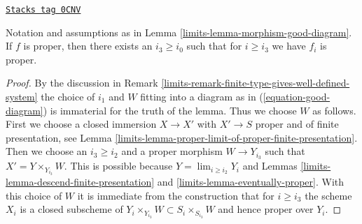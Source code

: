 \begin{lemma}
\label{limits-lemma-morphism-good-diagram-proper}
\href{https://stacks.math.columbia.edu/tag/0CNV}{\texttt{Stacks tag 0CNV}}

Notation and assumptions as in Lemma \ref{limits-lemma-morphism-good-diagram}.
If $f$ is proper, then there exists an $i_3 \geq i_0$ such that for
$i \geq i_3$ we have $f_i$ is proper.
\end{lemma}

\begin{proof}

By the discussion in
Remark \ref{limits-remark-finite-type-gives-well-defined-system}
the choice of $i_1$ and $W$ fitting into a diagram as in
(\ref{equation-good-diagram}) is immaterial for the truth of
the lemma. Thus we choose $W$ as follows.
First we choose a closed immersion $X \to X'$
with $X' \to S$ proper and of finite presentation, see
Lemma \ref{limits-lemma-proper-limit-of-proper-finite-presentation}.
Then we choose an $i_3 \geq i_2$ and a proper morphism $W \to Y_{i_3}$
such that $X' = Y \times_{Y_{i_3}} W$. This is possible because
$Y = \lim_{i \geq i_2} Y_i$ and
Lemmas \ref{limits-lemma-descend-finite-presentation} and
\ref{limits-lemma-eventually-proper}.
With this choice of $W$ it is immediate from the construction that
for $i \geq i_3$ the scheme $X_i$ is a closed subscheme of
$Y_i \times_{Y_{i_3}} W \subset S_i \times_{S_{i_3}} W$
and hence proper over $Y_i$.
\end{proof}

